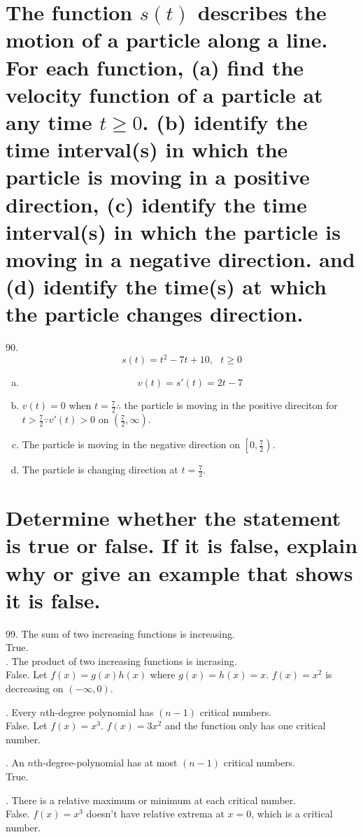 \documentclass[11pt]{article}
\newcommand*{\next}{\noindent}
\begin{document}
\section{The function $s(t)$ describes the motion of a particle along a line. For each function, (a) find the velocity function of a particle at any time $t\geq 0$. (b) identify the time interval(s) in which the particle is moving in a positive direction, (c) identify the time interval(s) in which the particle is moving in a negative direction. and (d) identify the time(s) at which the particle changes direction.}
90.\[s(t)=t^2-7t+10,\,\,\,\, t\geq 0\]
\begin{enumerate}[(a)]
    \item \[v(t)=s'(t)=2t-7\]
    \item $v(t)=0$ when $t=\frac{7}{2}\therefore$ the particle is moving in the positive direciton for $t>\frac{7}{2}\because v'(t)>0$ on $\left(\frac{7}{2}, \infty\right)$.
    \item The particle is moving in the negative direction on $\left[0, \frac{7}{2}\right)$.
    \item The particle is changing direction at $t=\frac{7}{2}$.
\end{enumerate}

\section{Determine whether the statement is true or false. If it is false, explain why or give an example that shows it is false.}
99. The sum of two increasing functions is increasing.\\
\indent True.\\

\vspace{0.25cm}
\next
100. The product of two increasing functions is incrasing.\\
\indent False. Let $f(x)=g(x)h(x)$ where $g(x)=h(x)=x$. $f(x)=x^2$ is decreasing on $(-\infty, 0)$.

\vspace{0.75cm}
\next
101. Every $n$th-degree polynomial has $(n-1)$ critical numbers.\\
\indent False. Let $f(x)=x^3$. $f(x)=3x^2$ and the function only has one critical number.


\vspace{0.75cm}
\next
102. An $n$th-degree-polynomial has at most $(n-1)$ critical numbers.\\
\indent True.

\vspace{0.75cm}
\next
103. There is a relative maximum or minimum at each critical number.\\
\indent False. $f(x)=x^3$ doesn't have relative extrema at $x=0$, which is a critical number.
\end{document}
